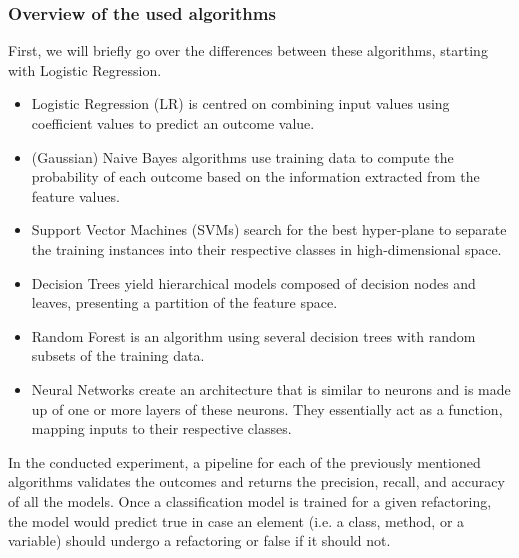 \subsubsection{Overview of the used algorithms}
First, we will briefly go over the differences between these algorithms, starting with Logistic Regression.
\begin{itemize}
    \item Logistic Regression (LR) \cite{biship2007pattern} is centred on combining input values using coefficient values to predict an outcome value.
    \item (Gaussian) Naive Bayes algorithms \cite{zhang2014optimality} use training data to compute the probability of each outcome based on the information extracted from the feature values.
    \item Support Vector Machines (SVMs) \cite{cortes1995support} search for the best hyper-plane to separate the training instances into their respective classes in high-dimensional space.
    \item Decision Trees \cite{quinlan2014c4} yield hierarchical models composed of decision nodes and leaves, presenting a partition of the feature space.
    \item Random Forest \cite{breiman2001random} is an algorithm using several decision trees with random subsets of the training data.
    \item Neural Networks \cite{goodfellow2016deep} create an architecture that is similar to neurons and is made up of one or more layers of these neurons. They essentially act as a function, mapping inputs to their respective classes.
\end{itemize}
In the conducted experiment, a pipeline for each of the previously mentioned algorithms validates the outcomes and returns the precision, recall, and accuracy of all the models. Once a classification model is trained for a given refactoring, the model would predict true in case an element (i.e. a class, method, or a variable) should undergo a refactoring or false if it should not.
